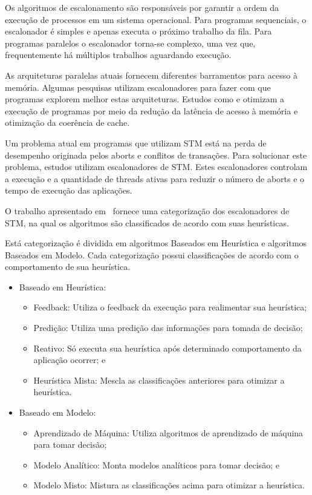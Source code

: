 \documentclass[diss,capa]{texufpel}
\begin{document}
Os algoritmos de escalonamento são responsáveis por garantir a ordem da execução de processos em um sistema operacional. Para programas sequenciais, o escalonador é simples e apenas executa o próximo trabalho da fila. Para programas paralelos o escalonador torna-se complexo, uma vez que, frequentemente há múltiplos trabalhos aguardando execução.

As arquiteturas paralelas atuais fornecem diferentes barramentos para acesso à memória. Algumas pesquisas utilizam escalonadores para fazer com que programas explorem melhor estas arquiteturas. Estudos como \cite{Rodolfo:2014} e \cite{pasqualin2020online} otimizam a execução de programas por meio da redução da latência de acesso à memória e otimização da coerência de cache.

Um problema atual em programas que utilizam STM está na perda de desempenho originada pelos aborts e conflitos de transações. Para solucionar este problema, estudos utilizam escalonadores de STM. Estes escalonadores controlam a execução e a quantidade de threads ativas para reduzir o número de aborts e o tempo de execução das aplicações.

O trabalho apresentado em~\cite{disanzo2017} fornece uma categorização dos escalonadores de STM, na qual os algoritmos são classificados de acordo com suas heurísticas.

Está categorização é dividida em algoritmos Baseados em Heurística e algoritmos Baseados em Modelo. Cada categorização possui classificações de acordo com o comportamento de sua heurística.

\begin{itemize}
 \item Baseado em Heurística:
 \begin{itemize}
     \item Feedback: Utiliza o feedback da execução para realimentar sua heurística;
     \item Predição: Utiliza uma predição das informações para tomada de decisão;
     \item Reativo: Só executa sua heurística após determinado comportamento da aplicação ocorrer; e
     \item Heurística Mista: Mescla as classificações anteriores para otimizar a heurística.
 \end{itemize}
 \item Baseado em Modelo:
 \begin{itemize}
     \item Aprendizado de Máquina: Utiliza algoritmos de aprendizado de máquina para tomar decisão;
     \item Modelo Analítico: Monta modelos analíticos para tomar decisão; e
     \item Modelo Misto: Mistura as classificações acima para otimizar a heurística.
 \end{itemize}
\end{itemize}
\end{document}
